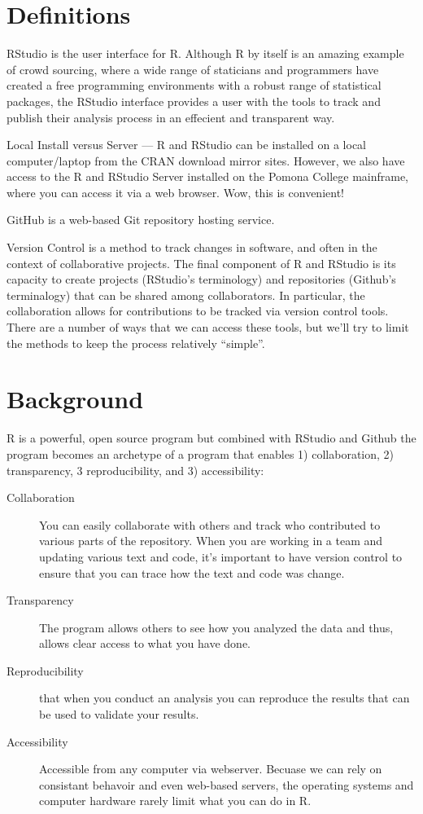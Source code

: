 \documentclass[12pt]{../SOP4_alpha}
\begin{document}
\section{Definitions}

\NP RStudio is the user interface for R. Although R by itself is an amazing example of crowd sourcing, where a wide range of staticians and programmers have created a free programming environments with a robust range of statistical packages, the RStudio interface provides a user with the tools to track and publish their analysis process in an effecient and transparent way. 

\NP Local Install versus Server --- R and RStudio can be installed on a local computer/laptop from the CRAN download mirror sites. However, we also have access to the R and RStudio Server installed on the Pomona College mainframe, where you can access it via a web browser. Wow, this is convenient!

\NP GitHub is a web-based Git repository hosting service. 

\NP Version Control is a method to track changes in software, and often in the context of collaborative projects. The final component of R and RStudio is its capacity to create projects (RStudio's terminology) and repositories (Github's terminalogy) that can be shared among collaborators. In particular, the collaboration allows for contributions to be tracked via version control tools. There are a number of ways that we can access these tools, but we'll try to limit the methods to keep the process relatively ``simple''.


\section{Background}

\NP R is a powerful, open source program but combined with RStudio and Github the program becomes an archetype of a program that enables 1) collaboration, 2) transparency, 3 reproducibility, and 3) accessibility: 

\begin{description}
    \item[Collaboration] You can easily collaborate with others and track who contributed to various parts of the repository. When you are working in a team and updating various text and code, it's important to have version control to ensure that you can trace how the text and code was change. 


  \item[Transparency] The program allows others to see how you analyzed the data and thus, allows clear access to what you have done.
    
  \item[Reproducibility]  that when you conduct an analysis you can reproduce the results that can be used to validate your results. 
  
  \item[Accessibility] Accessible from any computer via webserver. Becuase we can rely on consistant behavoir and even web-based servers, the operating systems and computer hardware rarely limit what you can do in R.

\end{description}
\end{document}
